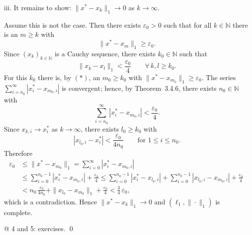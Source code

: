 \documentclass[12pt]{article}
\newcommand{\N}{\mathbb{N}}
\begin{document}
iii. It remains to show: $\|x^{\ast} - x_{k}\|_{1} \to 0$ as $k\to\infty$.

Assume this is not the case. Then there exists $\varepsilon_{0} > 0$ such that for all $k \in \N$ there is an $m \ge k$ with
\[
	\ \|x^{\ast} - x_{m}\|_{1} \ge \varepsilon_{0}.\tag{$*$}
\]
Since $(x_{k})_{k\in\N}$ is a Cauchy sequence, there exists $k_{0} \in \N$ such that
\[
	\ \|x_{k} - x_{l}\|_{1} < \frac{\varepsilon_{0}}{4} \qquad \forall\, k,l \ge k_{0}.
\]
For this $k_{0}$ there is, by $(*)$, an $m_{0} \ge k_{0}$ with $\|x^{\ast} - x_{m_{0}}\|_{1} \ge \varepsilon_{0}$. The series $\sum_{i=n_{0}}^{\infty} |x^{\ast}_{i} - x_{m_{0},i}|$ is convergent; hence, by Theorem~3.4.6, there exists $n_{0} \in \N$ with
\[
	\ \sum_{i=n_{0}}^{\infty} |x^{\ast}_{i} - x_{m_{0},i}| < \frac{\varepsilon_{0}}{4}.
\]
Since $x_{k,i} \to x^{\ast}_{i}$ as $k \to \infty$, there exists $l_{0} \ge k_{0}$ with
\[
	\ |x_{l_{0},i} - x^{\ast}_{i}| < \frac{\varepsilon_{0}}{4 n_{0}} \qquad \text{for } 1 \le i \le n_{0}.
\]
Therefore
\[
\begin{aligned}
\varepsilon_{0}
&\le \|x^{\ast} - x_{m_{0}}\|_{1}
 = \sum_{i=0}^{\infty} |x^{\ast}_{i} - x_{m_{0},i}|
 \\&\le \sum_{i=0}^{n_{0}-1} |x^{\ast}_{i} - x_{m_{0},i}| + \frac{\varepsilon_{0}}{4}
 \le \sum_{i=0}^{n_{0}-1} |x^{\ast}_{i} - x_{l_{0},i}| + \sum_{i=0}^{n_{0}-1} |x_{l_{0},i} - x_{m_{0},i}| + \frac{\varepsilon_{0}}{4} \\
&< n_{0}\,\frac{\varepsilon_{0}}{4 n_{0}} + \|x_{l_{0}} - x_{m_{0}}\|_{1} + \frac{\varepsilon_{0}}{4}
 < \frac{3}{4}\,\varepsilon_{0},
\end{aligned}
\]
which is a contradiction. Hence $\|x^{\ast}-x_k\|_{1}\to 0$ and $(\ell_1,\|\cdot\|_1)$ is complete.

@ 4 and 5: exercises. \qed
\end{document}
